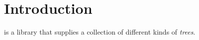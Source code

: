 \chapter{Introduction}
%

\sysname{} is a library that supplies a collection of different kinds
of \emph{trees}.
